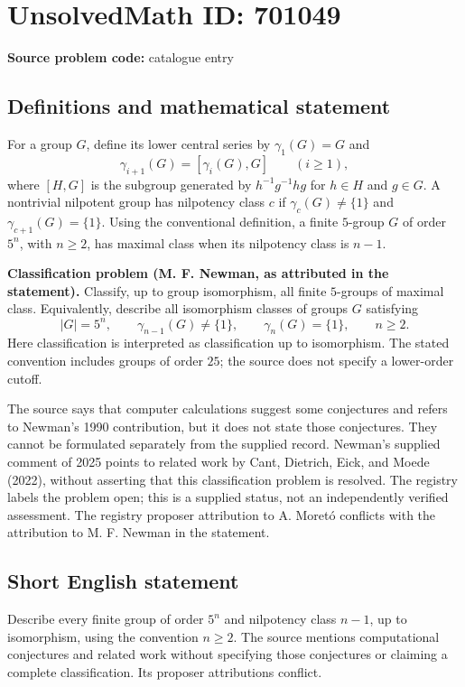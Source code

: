 \documentclass[11pt]{article}
\begin{document}
\section*{UnsolvedMath ID: 701049}
\textbf{Source problem code:} catalogue entry
\subsection{Definitions and mathematical statement}
For a group \(G\), define its lower central series by \(\gamma_1(G)=G\) and
\[
\gamma_{i+1}(G)=[\gamma_i(G),G]\qquad(i\geq 1),
\]
where \([H,G]\) is the subgroup generated by \(h^{-1}g^{-1}hg\) for \(h\in H\) and \(g\in G\). A nontrivial nilpotent group has nilpotency class \(c\) if \(\gamma_c(G)\neq\{1\}\) and \(\gamma_{c+1}(G)=\{1\}\). Using the conventional definition, a finite \(5\)-group \(G\) of order \(5^n\), with \(n\geq 2\), has maximal class when its nilpotency class is \(n-1\).

\textbf{Classification problem (M. F. Newman, as attributed in the statement).} Classify, up to group isomorphism, all finite \(5\)-groups of maximal class. Equivalently, describe all isomorphism classes of groups \(G\) satisfying
\[
|G|=5^n,\qquad \gamma_{n-1}(G)\neq\{1\},\qquad \gamma_n(G)=\{1\},\qquad n\geq 2.
\]
Here classification is interpreted as classification up to isomorphism. The stated convention includes groups of order \(25\); the source does not specify a lower-order cutoff.

The source says that computer calculations suggest some conjectures and refers to Newman's 1990 contribution, but it does not state those conjectures. They cannot be formulated separately from the supplied record. Newman's supplied comment of 2025 points to related work by Cant, Dietrich, Eick, and Moede (2022), without asserting that this classification problem is resolved. The registry labels the problem open; this is a supplied status, not an independently verified assessment. The registry proposer attribution to A. Moret\'{o} conflicts with the attribution to M. F. Newman in the statement.
\subsection{Short English statement}
Describe every finite group of order \(5^n\) and nilpotency class \(n-1\), up to isomorphism, using the convention \(n\geq 2\). The source mentions computational conjectures and related work without specifying those conjectures or claiming a complete classification. Its proposer attributions conflict.
\end{document}
